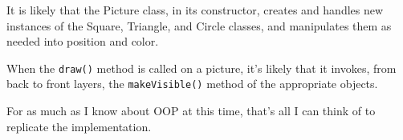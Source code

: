 It is likely that the Picture class, in its constructor, creates and
handles new instances of the Square, Triangle, and Circle classes, and
manipulates them as needed into position and color.

When the \verb|draw()| method is called on a picture, it's likely that
it invokes, from back to front layers, the \verb|makeVisible()| method
of the appropriate objects.

For as much as I know about OOP at this time, that's all I can think of
to replicate the implementation.
